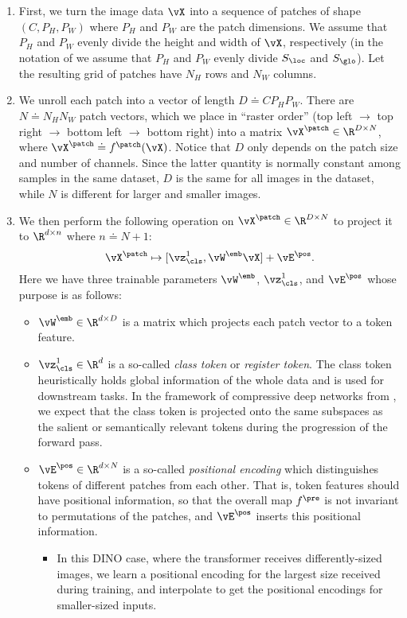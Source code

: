\documentclass[../../book-main.tex]{subfiles}
\begin{document}
\begin{enumerate}
    \item First, we turn the image data \(\vX\) into a sequence of patches of shape \((C, P_{H}, P_{W})\) where \(P_{H}\) and \(P_{W}\) are the patch dimensions. We assume that \(P_{H}\) and \(P_{W}\) evenly divide the height and width of \(\vX\), respectively (in the notation of  we assume that \(P_{H}\) and \(P_{W}\) evenly divide \(S_{\loc}\) and \(S_{\glo}\)). Let the resulting grid of patches have \(N_{H}\) rows and \(N_{W}\) columns.
    \item We unroll each patch into a vector of length \(D \doteq CP_{H}P_{W}\). There are \(N \doteq N_{H}N_{W}\) patch vectors, which we place in ``raster order'' (top left \(\to\) top right \(\to\) bottom left \(\to\) bottom right) into a matrix \(\vX^{\patch} \in \R^{D \times N}\), where \(\vX^{\patch} \doteq f^{\patch}(\vX)\). Notice that \(D\) only depends on the patch size and number of channels. Since the latter quantity is normally constant among samples in the same dataset, \(D\) is the same for all images in the dataset, while \(N\) is different for larger and smaller images.
    \item We then perform the following operation on \(\vX^{\patch} \in \R^{D \times N}\) to project it to \(\R^{d \times n}\) where \(n \doteq N + 1\):
    \begin{equation}
        \vX^{\patch} \mapsto [\vz_{\cls}^{1}, \vW^{\emb}\vX] + \vE^{\pos}.
    \end{equation}
    Here we have three trainable parameters \(\vW^{\emb}\), \(\vz_{\cls}^{1}\), and \(\vE^{\pos}\) whose purpose is as follows:
    \begin{itemize}
        \item \(\vW^{\emb} \in \R^{d \times D}\) is a matrix which projects each patch vector to a token feature.
        \item \(\vz_{\cls}^{1} \in \R^{d}\) is a so-called \textit{class token} or \textit{register token}. The class token heuristically holds global information of the whole data and is used for downstream tasks. In the framework of compressive deep networks from , we expect that the class token is projected onto the same subspaces as the salient or semantically relevant tokens during the progression of the forward pass.
        \item \(\vE^{\pos} \in \R^{d \times N}\) is a so-called \textit{positional encoding} which distinguishes tokens of different patches from each other. That is, token features should have positional information, so that the overall map \(f^{\pre}\) is not invariant to permutations of the patches, and \(\vE^{\pos}\) inserts this positional information. 
        \begin{itemize}
            \item In this DINO case, where the transformer receives differently-sized images, we learn a positional encoding for the largest size received during training, and interpolate to get the positional encodings for smaller-sized inputs.
        \end{itemize}
    \end{itemize}
\end{enumerate}
\end{document}
